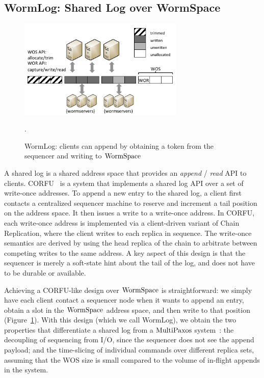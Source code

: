 \subsection{WormLog: Shared Log over WormSpace}
\label{chapter:wormspace:subsec:wormlog}

\begin{figure}
\centering
\includegraphics[width=0.7\textwidth, page=3]{figs/multipaxos/pics.pdf}
\caption{WormLog: clients can append by obtaining a token from the sequencer and writing to $\mathrm{WormSpace}$}
.\label{fig:chapter:multipaxos:wormlogarch}
\end{figure}



A shared log is a shared address space that provides an \textit{append} / \textit{read} API to clients. 
CORFU~\cite{corfu} is a system that implements a shared log API over a set of write-once addresses. 
To append a new entry to the shared log, a client first contacts a centralized sequencer machine to reserve and increment 
a tail position on the address space. It then issues a write to a write-once address. In CORFU, 
each write-once address is implemented via a client-driven variant of Chain Replication, 
where the client writes to each replica in sequence. 
The write-once semantics are derived by using the head replica of the chain to arbitrate between competing writes to the same address.
 A key aspect of this design is that the sequencer is merely a soft-state hint about the tail of the log, and does not have to be durable or available. 

Achieving a CORFU-like design over $\mathrm{WormSpace}$ is straightforward: 
we simply have each client contact a sequencer node when it wants to append an entry, obtain a slot in the $\mathrm{WormSpace}$ address space, 
and then write to that position (Figure~\ref{fig:chapter:multipaxos:wormlogarch}). 
With this design (which we call WormLog), 
we obtain the two properties that differentiate a shared log from a $\mathrm{MultiPaxos}$ system~\cite{corfupaxos}: the decoupling of sequencing 
from I/O, since the sequencer does not see the append payload; and the time-slicing of individual commands over different replica sets, 
assuming that the WOS size is small compared to the volume of in-flight appends in the system.

